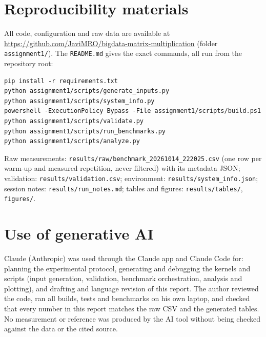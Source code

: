 \documentclass[11pt,a4paper]{article}
\newcommand{\repo}{\url{https://github.com/JaviMRO/bigdata-matrix-multiplication}}
\begin{document}
\section*{Reproducibility materials}
All code, configuration and raw data are available at \repo{} (folder \texttt{assignment1/}). The
\texttt{README.md} gives the exact commands, all run from the repository root:
\begin{lstlisting}
pip install -r requirements.txt
python assignment1/scripts/generate_inputs.py
python assignment1/scripts/system_info.py
powershell -ExecutionPolicy Bypass -File assignment1/scripts/build.ps1
python assignment1/scripts/validate.py
python assignment1/scripts/run_benchmarks.py
python assignment1/scripts/analyze.py
\end{lstlisting}
Raw measurements: \texttt{results/raw/benchmark\_20261014\_222025.csv} (one row per warm-up and
measured repetition, never filtered) with its metadata JSON; validation:
\texttt{results/validation.csv}; environment: \texttt{results/system\_info.json};
session notes: \texttt{results/run\_notes.md}; tables and figures: \texttt{results/tables/},
\texttt{figures/}.

\section*{Use of generative AI}
Claude (Anthropic) was used through the Claude app and Claude Code for: planning the experimental
protocol, generating and debugging the kernels and scripts (input generation, validation,
benchmark orchestration, analysis and plotting), and drafting and language revision of this report.
The author reviewed the code, ran all builds, tests and benchmarks on his own laptop, and checked
that every number in this report matches the raw CSV and the generated tables. No measurement or reference was
produced by the AI tool without being checked against the data or the cited source.
\end{document}
